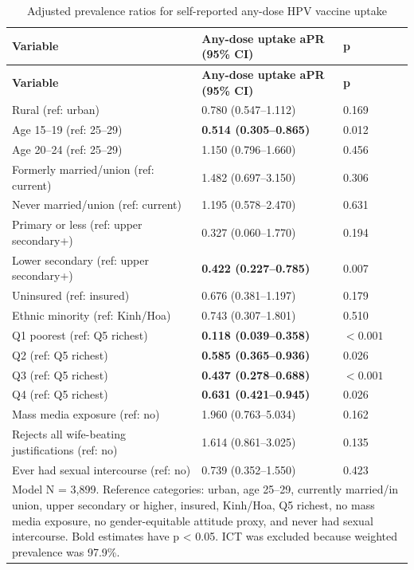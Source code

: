 \begin{longtable}{|p{6.2cm}|p{3.6cm}|p{1.3cm}|}
\caption{Adjusted prevalence ratios for self-reported any-dose HPV vaccine uptake}
\label{tab:adjusted_vaccination}\\
\hline
\textbf{Variable} & \textbf{Any-dose uptake aPR (95\% CI)} & \textbf{p} \\
\hline
\endfirsthead
\hline
\textbf{Variable} & \textbf{Any-dose uptake aPR (95\% CI)} & \textbf{p} \\
\hline
\endhead
Rural (ref: urban) & 0.780 (0.547--1.112) & 0.169 \\
Age 15--19 (ref: 25--29) & \textbf{0.514 (0.305--0.865)} & 0.012 \\
Age 20--24 (ref: 25--29) & 1.150 (0.796--1.660) & 0.456 \\
Formerly married/union (ref: current) & 1.482 (0.697--3.150) & 0.306 \\
Never married/union (ref: current) & 1.195 (0.578--2.470) & 0.631 \\
Primary or less (ref: upper secondary+) & 0.327 (0.060--1.770) & 0.194 \\
Lower secondary (ref: upper secondary+) & \textbf{0.422 (0.227--0.785)} & 0.007 \\
Uninsured (ref: insured) & 0.676 (0.381--1.197) & 0.179 \\
Ethnic minority (ref: Kinh/Hoa) & 0.743 (0.307--1.801) & 0.510 \\
Q1 poorest (ref: Q5 richest) & \textbf{0.118 (0.039--0.358)} & $<0.001$ \\
Q2 (ref: Q5 richest) & \textbf{0.585 (0.365--0.936)} & 0.026 \\
Q3 (ref: Q5 richest) & \textbf{0.437 (0.278--0.688)} & $<0.001$ \\
Q4 (ref: Q5 richest) & \textbf{0.631 (0.421--0.945)} & 0.026 \\
Mass media exposure (ref: no) & 1.960 (0.763--5.034) & 0.162 \\
Rejects all wife-beating justifications (ref: no) & 1.614 (0.861--3.025) & 0.135 \\
Ever had sexual intercourse (ref: no) & 0.739 (0.352--1.550) & 0.423 \\
\hline
\multicolumn{3}{|p{11.6cm}|}{\footnotesize Model N = 3,899. Reference categories: urban, age 25--29, currently married/in union, upper secondary or higher, insured, Kinh/Hoa, Q5 richest, no mass media exposure, no gender-equitable attitude proxy, and never had sexual intercourse. Bold estimates have p < 0.05. ICT was excluded because weighted prevalence was 97.9\%.} \\
\hline
\end{longtable}

